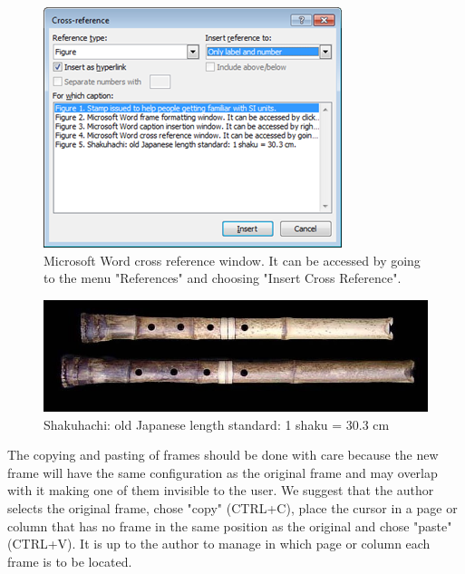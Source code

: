 \documentclass[10pt]{imeko_acta}
\begin{document}
\begin{figure}[!tb]
	\centering
	\includegraphics[width=\columnwidth]{image4}
	\caption{Microsoft Word cross reference window. It can be accessed by going to the menu "References" and choosing "Insert Cross Reference".}
	\label{fig:image4}
\end{figure}

\begin{figure}[!b]
	\centering
	\includegraphics[width=.9\linewidth]{wide_image}
	\caption{Shakuhachi: old Japanese length standard: 1 shaku = 30.3 cm}
	\label{fig:wideimage}
\end{figure}

The copying and pasting of frames should be done with care because the new frame will have the same configuration as the original frame and may overlap with it making one of them invisible to the user. We suggest that the author selects the original frame, chose "copy" (CTRL+C), place the cursor in a page or column that has no frame in the same position as the original and chose "paste" (CTRL+V). It is up to the author to manage in which page or column each frame is to be located.
\end{document}
